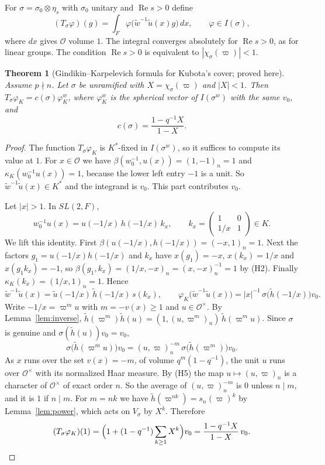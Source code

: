 \documentclass[12pt,letterpaper]{article}
\numberwithin{equation}{section}
\newtheorem{xtheorem}[theorem]{Theorem}
\theoremstyle{definition}
\newcommand{\proved}{proved here}
\newcommand{\OF}{\mathcal O}
\newcommand{\vp}{\varpi}
\newcommand{\wt}{\tilde w}
\newcommand{\hl}{\tilde h}
\newcommand{\ul}{\tilde u}
\DeclareMathOperator{\re}{Re}
\begin{document}
For $\sigma=\sigma_0\otimes\eta_s$ with $\sigma_0$ unitary and $\re s>0$ define
\begin{equation}\label{eq:T}
(T_\sigma\varphi)(g)=\int_F\varphi\bigl(\wt^{-1}\ul(x)g\bigr)\,dx,\qquad\varphi\in I(\sigma),
\end{equation}
where $dx$ gives $\OF$ volume $1$.  The integral converges absolutely for $\re s>0$, as for
linear groups.  The condition $\re s>0$ is equivalent to $|\chi_\sigma(\vp)|<1$.

\begin{xtheorem}[Gindikin--Karpelevich formula for Kubota's cover; \proved]\label{thm:GK}
Assume $p\nmid n$.  Let $\sigma$ be unramified with $X=\chi_\sigma(\vp)$ and $|X|<1$.  Then
$T_\sigma\varphi_K=c(\sigma)\varphi_K^{w}$, where $\varphi_K^w$ is the spherical vector of
$I(\sigma^w)$ with the same $v_0$, and
\[
c(\sigma)=\frac{1-q^{-1}X}{1-X}.
\]
\end{xtheorem}
\begin{proof}
The function $T_\sigma\varphi_K$ is $K^*$-fixed in $I(\sigma^w)$, so it suffices to compute
its value at $1$.  For $x\in\OF$ we have $\beta(w_0^{-1},u(x))=(1,-1)_n=1$ and
$\kappa_K(w_0^{-1}u(x))=1$, because the lower left entry $-1$ is a unit.  So
$\wt^{-1}\ul(x)\in K^*$ and the integrand is $v_0$.  This part contributes $v_0$.

Let $|x|>1$.  In $SL(2,F)$,
\[
w_0^{-1}u(x)=u(-1/x)\,h(-1/x)\,k_x,\qquad k_x=\begin{pmatrix}1&0\\1/x&1\end{pmatrix}\in K.
\]
We lift this identity.  First $\beta(u(-1/x),h(-1/x))=(-x,1)_n=1$.  Next the factors
$g_1=u(-1/x)h(-1/x)$ and $k_x$ have $x(g_1)=-x$, $x(k_x)=1/x$ and $x(g_1k_x)=-1$, so
$\beta(g_1,k_x)=(1/x,-x)_n=(x,-x)_n^{-1}=1$ by (H2).  Finally $\kappa_K(k_x)=(1/x,1)_n=1$.
Hence
\[
\wt^{-1}\ul(x)=\ul(-1/x)\,\hl(-1/x)\,s(k_x),\qquad
\varphi_K\bigl(\wt^{-1}\ul(x)\bigr)=|x|^{-1}\,\sigma\bigl(\hl(-1/x)\bigr)v_0 .
\]
Write $-1/x=\vp^mu$ with $m=-v(x)\ge1$ and $u\in\OF^\times$.  By Lemma~\ref{lem:inverse},
$\hl(\vp^m)\hl(u)=(1,(u,\vp^m)_n)\,\hl(\vp^mu)$.  Since $\sigma$ is genuine and
$\sigma(\hl(u))v_0=v_0$,
\[
\sigma\bigl(\hl(\vp^mu)\bigr)v_0=(u,\vp)_n^{-m}\,\sigma\bigl(\hl(\vp^m)\bigr)v_0 .
\]
As $x$ runs over the set $v(x)=-m$, of volume $q^m(1-q^{-1})$, the unit $u$ runs over
$\OF^\times$ with its normalized Haar measure.  By (H5) the map $u\mapsto(u,\vp)_n$ is a
character of $\OF^\times$ of exact order $n$.  So the average of $(u,\vp)_n^{-m}$ is $0$
unless $n\mid m$, and it is $1$ if $n\mid m$.  For $m=nk$ we have
$\hl(\vp^{nk})=s_n(\vp)^k$ by Lemma~\ref{lem:power}, which acts on $V_\sigma$ by $X^k$.
Therefore
\[
(T_\sigma\varphi_K)(1)=\Bigl(1+(1-q^{-1})\sum_{k\ge1}X^k\Bigr)v_0=\frac{1-q^{-1}X}{1-X}\,v_0 .\qedhere
\]
\end{proof}
\end{document}
